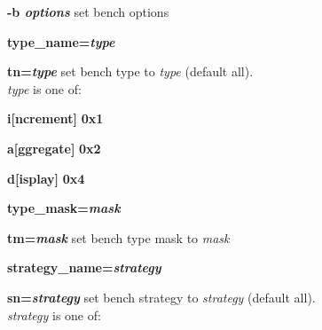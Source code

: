 \begin{list}{}
  {
    \setlength{\topsep}{0pt}
    \setlength{\partopsep}{0pt}
    \setlength{\parskip}{0pt}
    \setlength{\parsep}{0pt}
    \setlength{\itemsep}{0pt}
    \setlength{\itemindent}{0pt}
    \setlength{\leftmargin}{0.2\textwidth}
    \setlength{\labelsep}{0pt}
    \setlength{\labelwidth}{0.2\textwidth}
    \settowidth{\listparindent}{abc}
  }
\item[\bf{-b {\em options}}\hfill]
  set bench options

  \begin{list}{}
    {
      \setlength{\topsep}{0pt}
      \setlength{\partopsep}{0pt}
      \setlength{\parskip}{0pt}
      \setlength{\parsep}{0pt}
      \setlength{\itemsep}{0pt}
      \setlength{\itemindent}{0pt}
      \setlength{\leftmargin}{0.2\textwidth}
      \setlength{\labelsep}{0pt}
      \setlength{\labelwidth}{0.2\textwidth}
      \settowidth{\listparindent}{abc}
    }
  \item[\bf{type\_name={\em type}}\hfill]
  \item[\bf{tn={\em type}}\hfill]
    set bench type to {\em type} (default all).\\
    {\em type} is one of:
    \begin{list}{}
      {
	\setlength{\topsep}{0pt}
	\setlength{\partopsep}{0pt}
	\setlength{\parskip}{0pt}
	\setlength{\parsep}{0pt}
	\setlength{\itemsep}{0pt}
	\setlength{\itemindent}{0pt}
	\setlength{\leftmargin}{0.2\textwidth}
	\setlength{\labelsep}{0pt}
	\setlength{\labelwidth}{0.2\textwidth}
	\settowidth{\listparindent}{abc}
      }
    \item[\bf{i[ncrement]}\hfill] \bf{0x1}
    \item[\bf{a[ggregate]}\hfill] \bf{0x2}
    \item[\bf{d[isplay]}\hfill] \bf{0x4}
    \end{list}
  \item[\bf{type\_mask={\em mask}}\hfill]
  \item[\bf{tm={\em mask}}\hfill]
    set bench type mask to {\em mask}
  \item[\bf{strategy\_name={\em strategy}}\hfill]
  \item[\bf{sn={\em strategy}}\hfill]
    set bench strategy to {\em strategy} (default all).\\
    {\em strategy} is one of:
    \begin{list}{}
      {
	\setlength{\topsep}{0pt}
	\setlength{\partopsep}{0pt}
	\setlength{\parskip}{0pt}
	\setlength{\parsep}{0pt}
	\setlength{\itemsep}{0pt}
}
\end{list}
\end{list}
\end{list}

